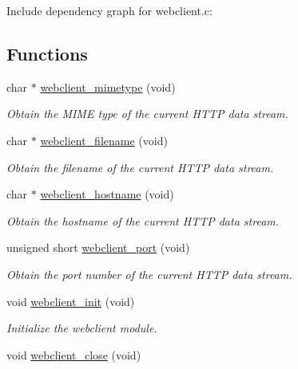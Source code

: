 Include dependency graph for webclient.c:\subsection*{Functions}
\begin{CompactItemize}
\item 
char $\ast$ \hyperlink{a00079_g4433d3af16ea083a81576d0f18ba57c9}{webclient\_\-mimetype} (void)
\begin{CompactList}\small\item\em Obtain the MIME type of the current HTTP data stream. \item\end{CompactList}\item 
char $\ast$ \hyperlink{a00079_g41e616d3fcc17e0aabfe8ab45ef0d30f}{webclient\_\-filename} (void)
\begin{CompactList}\small\item\em Obtain the filename of the current HTTP data stream. \item\end{CompactList}\item 
char $\ast$ \hyperlink{a00079_g0e0ea5f24b77f124ba33bcbc7ede5bfb}{webclient\_\-hostname} (void)
\begin{CompactList}\small\item\em Obtain the hostname of the current HTTP data stream. \item\end{CompactList}\item 
unsigned short \hyperlink{a00079_g2a939aa4fcffabbce1dc1f784a7e0ad3}{webclient\_\-port} (void)
\begin{CompactList}\small\item\em Obtain the port number of the current HTTP data stream. \item\end{CompactList}\item 
\hypertarget{a00079_g3caacabb2fe1c71921e1a471719ccbd2}{
void \hyperlink{a00079_g3caacabb2fe1c71921e1a471719ccbd2}{webclient\_\-init} (void)}
\label{a00079_g3caacabb2fe1c71921e1a471719ccbd2}

\begin{CompactList}\small\item\em Initialize the webclient module. \item\end{CompactList}\item 
\hypertarget{a00079_g1d34be506a61db90dd7829117efdf8cf}{
void \hyperlink{a00079_g1d34be506a61db90dd7829117efdf8cf}{webclient\_\-close} (void)}
\label{a00079_g1d34be506a61db90dd7829117efdf8cf}


\end{CompactItemize}

